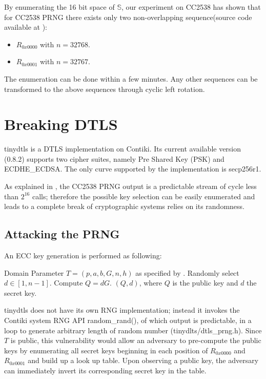 By enumerating the 16 bit space of $\mathbb{S}$, our experiment on CC2538 has shown that for CC2538 PRNG there exists only two non-overlapping sequence(source code available at \cite{prngtest}):
\begin{itemize}
	\item $R_{0x0000}$ with $n = 32768$.
	\item $R_{0x0001}$ with $n = 32767$.
\end{itemize}
The enumeration can be done within a few minutes. Any other sequences can be transformed to the above sequences through cyclic left rotation. 

\section{Breaking DTLS} \label{BreakDTLS}
tinydtls\cite{tinydtls} is a DTLS implementation on Contiki. Its current available version\cite{tinydtls082} (0.8.2) supports two cipher suites, namely Pre Shared Key (PSK) and ECDHE\_ECDSA\cite{rfc4492}. The only curve supported by the implementation is secp256r1\cite{secp256r1}.

As explained in , the CC2538 PRNG output is a predictable stream of cycle less than $2^{16}$ calls; therefore the possible key selection can be easily enumerated and leads to a complete break of cryptographic systems relies on its randomness.    

\subsection{Attacking the PRNG}

An ECC key generation is performed as following:
\begin{algorithmic}[1]
\REQUIRE Domain Parameter $T = (p, a, b, G, n, h)$ as specified by \cite{secp256r1}.
\STATE Randomly select $d \in [1, n-1]$.
\STATE Compute $Q = dG$.
\RETURN $(Q,d)$, where $Q$ is the public key and $d$ the secret key.
\end{algorithmic}

tinydtls does not have its own RNG implementation; instead it invokes the Contiki system RNG API random\_rand(), of which output is predictable, in a loop to generate arbitrary length of random number (tinydlts/dtls\_prng.h). Since $T$ is public, this vulnerability would allow an adversary to pre-compute the public keys by enumerating all secret keys beginning in each position of $R_{0x0000}$ and $R_{0x0001}$ and build up a look up table. Upon observing a public key, the adversary can immediately invert its corresponding secret key in the table.

